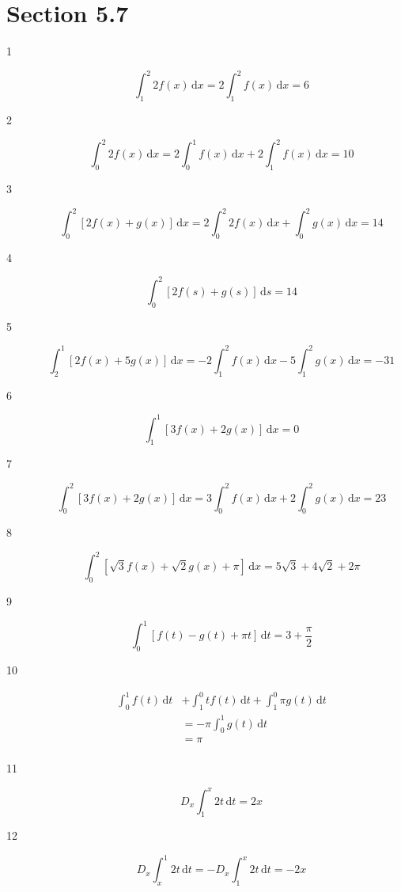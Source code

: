 \documentclass{exam}
\begin{document}
\section{Section 5.7}

\begin{description}

\item[1]
\[
  \int_1^2 2f(x) \, \mathrm{d}x = 2 \int_1^2 f(x) \, \mathrm{d}x = 6
\]

\item[2]
\[
  \int_0^2 2f(x) \, \mathrm{d}x = 2 \int_0^1 f(x) \, \mathrm{d}x + 2 \int_1^2 f(x) \, \mathrm{d}x = 10
\]

\item[3]
\[
  \int_0^2 [ 2f(x) + g(x) ]\, \mathrm{d}x = 2 \int_0^2  2f(x)\, \mathrm{d}x + \int_0^2 g(x)\, \mathrm{d}x = 14
\]

\item[4]
\[
  \int_0^2 [ 2f(s) + g(s) ]\, \mathrm{d}s = 14
\]

\item[5]
\[
  \int_2^1 [ 2f(x) + 5g(x) ]\, \mathrm{d}x = -2 \int_1^2 f(x) \, \mathrm{d}x - 5 \int_1^2 g(x)  \, \mathrm{d}x = -31
\]

\item[6]
\[
  \int_1^1 [ 3f(x) + 2 g(x) ]\, \mathrm{d}x = 0
\]

\item[7]
\[
  \int_0^2 [ 3f(x) + 2 g(x) ]\, \mathrm{d}x = 3 \int_0^2 f(x) \, \mathrm{d}x + 2 \int_0^2 g(x) \, \mathrm{d}x = 23
\]

\item[8]
\[
  \int_0^2 [ \sqrt{3} f(x) + \sqrt{2} g(x) + \pi]\, \mathrm{d}x = 5 \sqrt{3} + 4 \sqrt{2} + 2 \pi
\]

\item[9]
\[
  \int_0^1 [ f(t) - g(t) + \pi t]\, \mathrm{d}t = 3 + \frac{\pi}{2}
\]

\item[10]
\begin{align*}
  \int_0^1 f(t) \, \mathrm{d}t &+ \int_1^0 t f(t) \, \mathrm{d}t + \int_1^0 \pi g(t) \, \mathrm{d}t \\
  &= - \pi \int_0^1 g(t) \, \mathrm{d}t \\
  &= \pi \\
\end{align*}

\item[11]
\[
  D_x \int_1^x 2t \, \mathrm{d}t = 2x
\]

\item[12]
\[
  D_x \int_x^1 2t \, \mathrm{d}t = - D_x \int_1^x 2t \, \mathrm{d}t = -2x
\]


\end{description}
\end{document}
